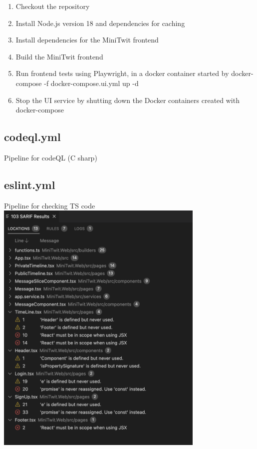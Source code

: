 \begin{enumerate}
    \item Checkout the repository
    \item Install Node.js version 18 and dependencies for caching
    \item Install dependencies for the MiniTwit frontend
    \item Build the MiniTwit frontend
    \item Run frontend tests using Playwright, in a docker container started by docker-compose -f docker-compose.ui.yml up -d
    \item Stop the UI service by shutting down the Docker containers created with docker-compose
\end{enumerate}

\subsection{codeql.yml}
Pipeline for codeQL (C sharp) 

\subsection{eslint.yml}
Pipeline for checking TS code\\
\includegraphics[width=10cm]{Report/img/Eslint_report.png}

